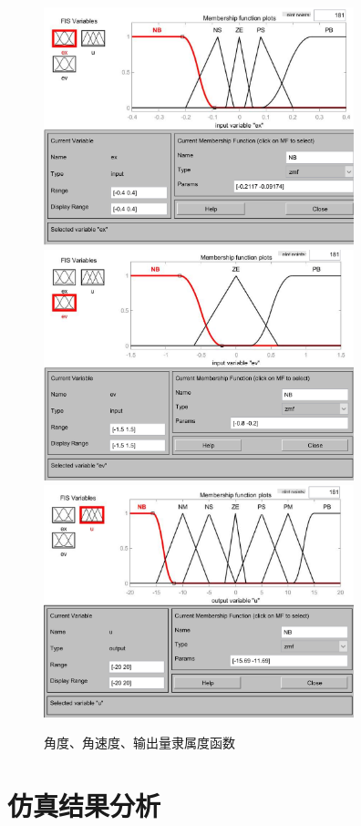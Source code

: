 \begin{figure}[hbpt]
\centering
\includegraphics[width=9cm]{weiyi1.png}
\includegraphics[width=9cm]{weiyi2.png}
\includegraphics[width=9cm]{weiyi3.png}
\caption{角度、角速度、输出量隶属度函数}\label{Fig:weiyi}
\end{figure}

\section{仿真结果分析}
